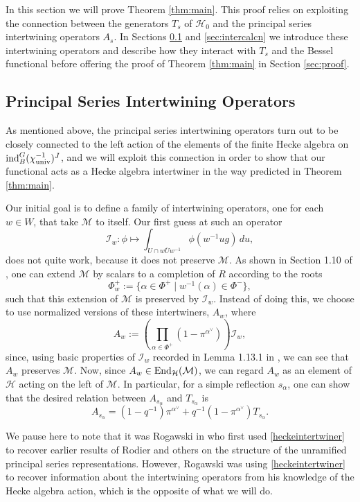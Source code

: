 \documentclass[11pt,letterpaper]{article}
\newcommand{\calI}{\mathcal{I}}
\newcommand{\calH}{\mathcal{H}} %
\newcommand{\M}{\mathcal{M}}
\newcommand{\End}{\textup{End}}
\newcommand{\ind}{\textup{ind}}
\theoremstyle{remark}
\numberwithin{equation}{section}
\begin{document}
In this section we will prove Theorem \ref{thm:main}. This proof relies on exploiting the connection between the generators $T_s$ of $\calH_0$ and the principal series intertwining operators $A_s$. In Sections \ref{sec:psio} and \ref{sec:intercalcn} we introduce these intertwining operators and describe how they interact with $T_s$ and the Bessel functional before offering the proof of Theorem \ref{thm:main} in Section \ref{sec:proof}.

\subsection{Principal Series Intertwining Operators}\label{sec:psio}

As mentioned above, the principal series intertwining operators turn out to be closely connected to the left action of the elements of the finite Hecke algebra on $\ind_B^G(\chi_{\textup{univ}}^{-1})^J$, and we will exploit this connection in order to show that our functional acts as a Hecke algebra intertwiner in the way predicted in Theorem \ref{thm:main}. 

Our initial goal is to define a family of intertwining operators, one for each $w \in W$, that take $\M$ to itself. Our first guess at such an operator $$\calI_w : \phi \mapsto \int_{U \cap w\overline{U}w^{-1}} \phi(w^{-1}ug)\,du,$$ does not quite work, because it does not preserve $\M$. As shown in Section 1.10 of \cite{HKP}, one can extend $\M$ by scalars to a completion of $R$ according to the roots $$\Phi_{w}^+ := \{\alpha \in \Phi^+ \mid w^{-1}(\alpha) \in \Phi^-\},$$ such that this extension of $\M$ is preserved by $\calI_w$. Instead of doing this, we choose to use normalized versions of these intertwiners, $A_w$, where $$A_w := \left( \prod_{\alpha \in \Phi^+} (1-\pi^{\alpha^{\vee}}) \right)\calI_w,$$ since, using basic properties of $\calI_w$ recorded in Lemma 1.13.1 in \cite{HKP}, we can see that $A_w$ preserves $\M$. Now, since $A_w \in \End_{\calH}(\M)$, we can regard $A_w$ as an element of $\calH$ acting on the left of $\M$. In particular, for a simple reflection $s_{\alpha}$, one can show that the desired relation between $A_{s_{\alpha}}$ and $T_{s_{\alpha}}$ is \begin{equation} \label{heckeintertwiner} A_{s_{\alpha}} = (1-q^{-1})\pi^{\alpha^{\vee}} + q^{-1}(1-\pi^{\alpha^{\vee}})T_{s_{\alpha}}.\end{equation}

We pause here to note that it was Rogawski in \cite{Rog} who first used \eqref{heckeintertwiner} to recover earlier results of Rodier and others on the structure of the unramified principal series representations. However, Rogawski was using \eqref{heckeintertwiner} to recover information about the intertwining operators from his knowledge of the Hecke algebra action, which is the opposite of what we will do.
\end{document}
